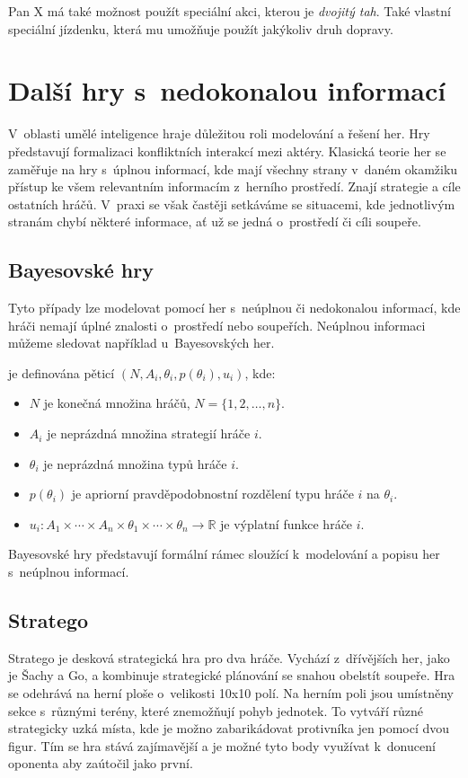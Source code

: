Pan X má také možnost použít speciální akci, kterou je \emph{dvojitý tah}.
Také vlastní speciální jízdenku, která mu umožňuje použít jakýkoliv druh dopravy.

\section{Další hry s~nedokonalou informací}\label{sec:dalsi-hry-s-nedokonalou-informaci}
V~oblasti umělé inteligence hraje důležitou roli modelování a řešení her.
Hry představují formalizaci konfliktních interakcí mezi aktéry.
Klasická teorie her se zaměřuje na hry s~úplnou informací, kde mají všechny strany v~daném okamžiku přístup ke všem relevantním informacím z~herního prostředí.
Znají strategie a cíle ostatních hráčů.
V~praxi se však častěji setkáváme se situacemi, kde jednotlivým stranám chybí některé informace, ať už se jedná o~prostředí či cíli soupeře.

\subsection{Bayesovské hry}
Tyto případy lze modelovat pomocí her s~neúplnou či nedokonalou informací, kde hráči nemají úplné znalosti o~prostředí nebo soupeřích.
Neúplnou informaci můžeme sledovat například u~Bayesovských her.

\begin{definition}
\cite{Y_Narahari} je definována pěticí $(N, A_i, \theta_i, p(\theta_i), u_i)$, kde:

\begin{itemize}
\item $N$ je konečná množina hráčů, $N = \{1, 2, \ldots, n\}$.
\item $A_i$ je neprázdná množina strategií hráče $i$.
\item $\theta_i$ je neprázdná množina typů hráče $i$.
\item $p(\theta_i)$ je apriorní pravděpodobnostní rozdělení typu hráče $i$ na $\theta_i$.
\item $u_i: A_1 \times \cdots \times A_n \times \theta_1 \times \cdots \times \theta_n \rightarrow \mathbb{R}$ je výplatní funkce hráče $i$.
\end{itemize}
\end{definition}

Bayesovské hry představují formální rámec sloužící k~modelování a popisu her s~neúplnou informací.

\subsection{Stratego}\label{subsec:stratego}
Stratego je desková strategická hra pro dva hráče.
Vychází z~dřívějších her, jako je Šachy a Go, a kombinuje strategické plánování se snahou obelstít soupeře.
Hra se odehrává na herní ploše o~velikosti 10x10 polí.
Na herním poli jsou umístněny sekce s~různými terény, které znemožňují pohyb jednotek.
To vytváří různé strategicky uzká místa, kde je možno zabarikádovat protivníka jen pomocí dvou figur.
Tím se hra stává zajímavější a je možné tyto body využívat k~donucení oponenta aby zaútočil jako první.

